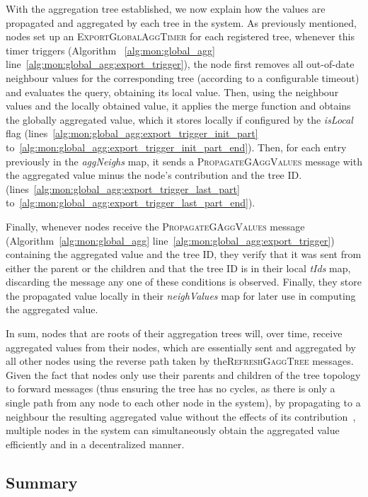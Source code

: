 With the aggregation tree established, we now explain how the values are propagated and aggregated by each tree in the system. As previously mentioned, nodes set up an \textsc{ExportGlobalAggTimer} for each registered tree, whenever this timer triggers (Algorithm ~\ref{alg:mon:global_agg} line~\ref{alg:mon:global_agg:export_trigger}), the node first removes all out-of-date neighbour values for the corresponding tree (according to a configurable timeout) and evaluates the query, obtaining its local value. Then, using the neighbour values and the locally obtained value, it applies the merge function and obtains the globally aggregated value, which it stores locally if configured by the \textit{isLocal} flag (lines~\ref{alg:mon:global_agg:export_trigger_init_part} to~\ref{alg:mon:global_agg:export_trigger_init_part_end}). Then, for each entry previously in the \textit{aggNeighs} map, it sends a \textsc{PropagateGAggValues} message with the aggregated value minus the node's contribution and the tree ID. (lines~\ref{alg:mon:global_agg:export_trigger_last_part} to~\ref{alg:mon:global_agg:export_trigger_last_part_end}). 

Finally, whenever nodes receive the \textsc{PropagateGAggValues} message (Algorithm~\ref{alg:mon:global_agg} line~\ref{alg:mon:global_agg:export_trigger}) containing the aggregated value and the tree ID, they verify that it was sent from either the parent or the children and that the tree ID is in their local \textit{tIds} map, discarding the message any one of these conditions is observed. Finally, they store the propagated value locally in their \textit{neighValues} map for later use in computing the aggregated value.

In sum, nodes that are roots of their aggregation trees will, over time, receive aggregated values from their nodes, which are essentially sent and aggregated by all other nodes using the reverse path taken by the\textsc{RefreshGaggTree} messages. Given the fact that nodes only use their parents and children of the tree topology to forward messages (thus ensuring the tree has no cycles, as there is only a single path from any node to each other node in the system), by propagating to a neighbour the resulting aggregated value without the effects of its contribution~\cite{akosThesis}, multiple nodes in the system can simultaneously obtain the aggregated value efficiently and in a decentralized manner.

\subsection{Summary}

